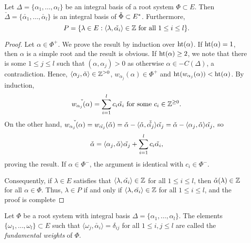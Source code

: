 \begin{lemma}
    Let $\Delta=\{\alpha_1,\ldots,\alpha_l\}$ be an integral basis of a root system $\Phi\subset E$. Then $\check{\Delta}=\{\check{\alpha_1},\ldots,\check{\alpha_l}\}$ is an integral basis of $\check{\Phi}\subset E^*$. Furthermore,
    $$P=\{\lambda\in E:\langle\lambda,\check{\alpha_i}\rangle\in\mathbb{Z}\text{ for all }1\leq i\leq l\}.$$
\end{lemma}
\begin{proof}
    Let $\alpha\in\Phi^+$. We prove the result by induction over $\mathrm{ht}(\alpha)$. If $\mathrm{ht}(\alpha)=1$, then $\alpha$ is a simple root and the result is obvious. If $\mathrm{ht}(\alpha)\geq2$, we note that there is some $1\leq j\leq l$ such that $(\alpha,\alpha_j)>0$ as otherwise $\alpha\in -C(\Delta)$, a contradiction. Hence, $\langle\alpha_j,\check{\alpha}\rangle\in\mathbb{Z}^{>0}$, $w_{\alpha_j}(\alpha)\in\Phi^+$ and $\mathrm{ht}(w_{\alpha_j}(\alpha))<\mathrm{ht}(\alpha)$. By induction, $$\check{w_{\alpha_j}(\alpha)}=\sum_{i=1}^{l}c_i\check{\alpha_i}\text{ for some }c_i\in\mathbb{Z}^{\geq0}.$$
    On the other hand, $\check{w_{\alpha_j}(\alpha)}=w_{\check{\alpha_j}}(\check{\alpha})=\check{\alpha}-\langle\check{\alpha},\check{\check{\alpha_j}}\rangle\check{\alpha_j}=\check{\alpha}-\langle\alpha_j,\check{\alpha}\rangle\check{\alpha_j},$ so 
    $$\check{\alpha}=\langle\alpha_j,\check{\alpha}\rangle\check{\alpha_j}+\sum_{i=1}^{l}c_i\check{\alpha_i},$$
    proving the result. If $\alpha\in\Phi^-$, the argument is identical with $c_i\in\Phi^-$.

    Consequently, if $\lambda\in E$ satisfies that $\langle\lambda,\check{\alpha_i}\rangle\in\mathbb{Z}$ for all $1\leq i\leq l$, then $\check{\alpha}(\lambda)\in\mathbb{Z}$ for all $\alpha\in\Phi$. Thus, $\lambda\in P$ if and only if $\langle\lambda,\check{\alpha_i}\rangle\in\mathbb{Z}$ for all $1\leq i\leq l$, and the proof is complete
\end{proof}


\begin{definition}
    Let $\Phi$ be a root system with integral basis $\Delta=\{\alpha_1,\ldots,\alpha_l\}$. The elements $\{\omega_1,\ldots,\omega_l\}\subset E$ such that $\langle\omega_j,\check{\alpha_i}\rangle=\delta_{ij}$ for all $1\leq i,j\leq l$ are called the \textit{fundamental weights} of $\Phi$.
\end{definition}

